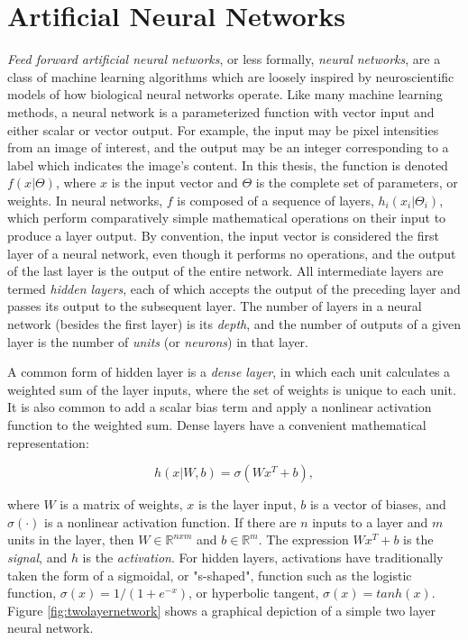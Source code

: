 \chapter{Artificial Neural Networks}
\label{chap:neuralnetworks}

\textit{Feed forward artificial neural networks}, or less formally, \textit{neural networks}, are a class of machine learning algorithms which are loosely inspired by neuroscientific models of how biological neural networks operate\cite{mcculloch1943}. 
Like many machine learning methods, a neural network is a parameterized function with vector input and either scalar or vector output.
For example, the input may be pixel intensities from an image of interest, and the output may be an integer corresponding to a label which indicates the image's content.
In this thesis, the function is denoted $f(x|\Theta)$, where $x$ is the input vector and $\Theta$ is the complete set of parameters, or weights.
In neural networks, $f$ is composed of a sequence of layers, $h_i(x_i|\Theta_i)$, which perform comparatively simple mathematical operations on their input to produce a layer output.
By convention, the input vector is considered the first layer of a neural network, even though it performs no operations, and the output of the last layer is the output of the entire network.
All intermediate layers are termed \textit{hidden layers}, each of which accepts the output of the preceding layer and passes its output to the subsequent layer.
The number of layers in a neural network (besides the first layer) is its \textit{depth}, and the number of outputs of a given layer is the number of \textit{units} (or \textit{neurons}) in that layer.

A common form of hidden layer is a \textit{dense layer}, in which each unit calculates a weighted sum of the layer inputs, where the set of weights is unique to each unit.
It is also common to add a scalar bias term and apply a nonlinear activation function to the weighted sum.
Dense layers have a convenient mathematical representation:

\begin{equation}
h(x|W, b)=\sigma(W x^T + b),
\label{eq:denselayer}
\end{equation}

\noindent
where $W$ is a matrix of weights, $x$ is the layer input, $b$ is a vector of biases, and $\sigma(\cdot)$ is a nonlinear activation function.
If there are $n$ inputs to a layer and $m$ units in the layer, then $W\in\mathbb{R}^{nxm}$ and $b\in\mathbb{R}^{m}$.
The expression $W x^T + b$ is the \textit{signal}, and $h$ is the \textit{activation}.
For hidden layers, activations have traditionally taken the form of a sigmoidal, or "s-shaped", function such as the logistic function, $\sigma(x) = 1/(1+e^{-x})$, or hyperbolic tangent, $\sigma(x) = tanh(x)$.
Figure \ref{fig:twolayernetwork} shows a graphical depiction of a simple two layer neural network.

